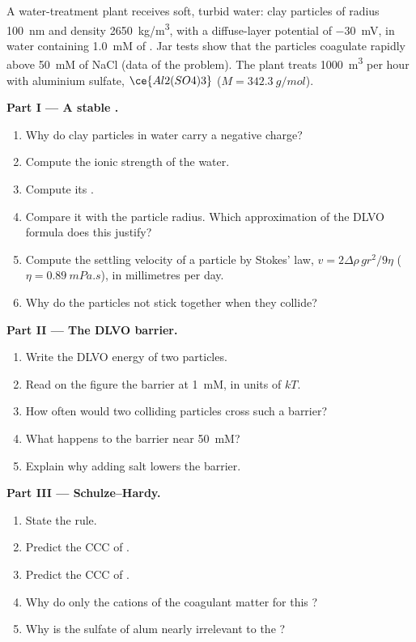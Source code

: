 \begin{problem}
\label{pb:b3:colloids:1}
A water-treatment plant receives soft, turbid water: clay particles of radius
\qty{100}{nm} and density \qty{2650}{kg/m^3}, with a diffuse-layer potential of \qty{-30}{mV}, in
water containing \qty{1.0}{mM} of . Jar tests show that the particles coagulate
rapidly above \qty{50}{mM} of NaCl (data of the problem). The plant treats \qty{1000}{m^3} per
hour with aluminium sulfate, $\ce{Al2(SO4)3}$ ($M = \qty{342.3}{g/mol}$).

\medskip\noindent\textbf{Part I --- A stable .}
\begin{enumerate}
  \item Why do clay particles in water carry a negative charge?
  \item Compute the ionic strength of the water.
  \item Compute its .
  \item Compare it with the particle radius. Which approximation of the DLVO
        formula does this justify?
  \item Compute the settling velocity of a particle by Stokes' law, $v =
        2\Delta\rho\,gr^2/9\eta$ ($\eta = \qty{0.89}{mPa.s}$), in millimetres per day.
  \item Why do the particles not stick together when they collide?
\end{enumerate}

\medskip\noindent\textbf{Part II --- The DLVO barrier.}
\begin{enumerate}[resume]
  \item Write the DLVO energy of two particles.
  \item Read on the figure the barrier at \qty{1}{mM}, in units of $kT$.
  \item How often would two colliding particles cross such a barrier?
  \item What happens to the barrier near \qty{50}{mM}?
  \item Explain why adding salt lowers the barrier.
\end{enumerate}

\medskip\noindent\textbf{Part III --- Schulze--Hardy.}
\begin{enumerate}[resume]
  \item State the rule.
  \item Predict the CCC of .
  \item Predict the CCC of .
  \item Why do only the cations of the coagulant matter for this ?
  \item Why is the sulfate of alum nearly irrelevant to the ?
\end{enumerate}


\end{problem}
